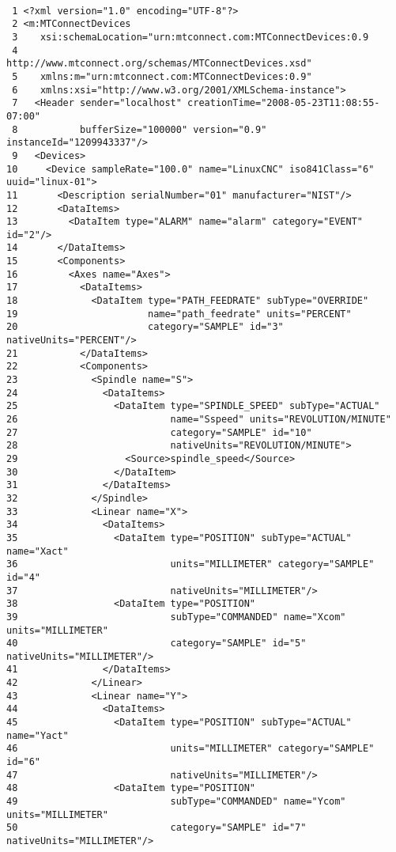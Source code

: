 \begin{verbatim}

 1 <?xml version="1.0" encoding="UTF-8"?>
 2 <m:MTConnectDevices
 3    xsi:schemaLocation="urn:mtconnect.com:MTConnectDevices:0.9
 4                        http://www.mtconnect.org/schemas/MTConnectDevices.xsd"
 5    xmlns:m="urn:mtconnect.com:MTConnectDevices:0.9"
 6    xmlns:xsi="http://www.w3.org/2001/XMLSchema-instance">
 7   <Header sender="localhost" creationTime="2008-05-23T11:08:55-07:00"
 8           bufferSize="100000" version="0.9" instanceId="1209943337"/>
 9   <Devices>
10     <Device sampleRate="100.0" name="LinuxCNC" iso841Class="6" uuid="linux-01">
11       <Description serialNumber="01" manufacturer="NIST"/>
12       <DataItems>
13         <DataItem type="ALARM" name="alarm" category="EVENT" id="2"/>
14       </DataItems>
15       <Components>
16         <Axes name="Axes">
17           <DataItems>
18             <DataItem type="PATH_FEEDRATE" subType="OVERRIDE"
19                       name="path_feedrate" units="PERCENT"
20                       category="SAMPLE" id="3" nativeUnits="PERCENT"/>
21           </DataItems>
22           <Components>
23             <Spindle name="S">
24               <DataItems>
25                 <DataItem type="SPINDLE_SPEED" subType="ACTUAL"
26                           name="Sspeed" units="REVOLUTION/MINUTE"
27                           category="SAMPLE" id="10"
28                           nativeUnits="REVOLUTION/MINUTE">
29                   <Source>spindle_speed</Source>
30                 </DataItem>
31               </DataItems>
32             </Spindle>
33             <Linear name="X">
34               <DataItems>
35                 <DataItem type="POSITION" subType="ACTUAL" name="Xact"
36                           units="MILLIMETER" category="SAMPLE" id="4"
37                           nativeUnits="MILLIMETER"/> 
38                 <DataItem type="POSITION"
39                           subType="COMMANDED" name="Xcom" units="MILLIMETER"
40                           category="SAMPLE" id="5" nativeUnits="MILLIMETER"/>
41               </DataItems>
42             </Linear>
43             <Linear name="Y">
44               <DataItems>
45                 <DataItem type="POSITION" subType="ACTUAL" name="Yact"
46                           units="MILLIMETER" category="SAMPLE" id="6"
47                           nativeUnits="MILLIMETER"/> 
48                 <DataItem type="POSITION"
49                           subType="COMMANDED" name="Ycom" units="MILLIMETER"
50                           category="SAMPLE" id="7" nativeUnits="MILLIMETER"/>

\end{verbatim}
